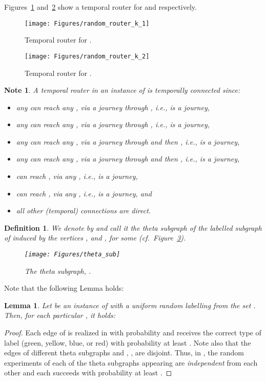 \documentclass[a4paper,UKenglish]{article}
\newtheorem{definition}{Definition}
\newtheorem{lemma}{Lemma}
\newtheorem*{note*}{Note}
\begin{document}
Figures~\ref{fig:random_router_k_1} and~\ref{fig:random_router_k_2} show a temporal router  for  and  respectively.
\begin{figure}[!htb]
\centering
\texttt{[image: Figures/random\_router\_k\_1]}
\caption{Temporal router  for .}
\label{fig:random_router_k_1}
\end{figure}

\begin{figure}[!htb]
\centering
\texttt{[image: Figures/random\_router\_k\_2]}
\caption{Temporal router  for .}
\label{fig:random_router_k_2}
\end{figure}

\begin{note*}
A temporal router  in an instance  of  is \emph{temporally connected} since:
\begin{itemize}
\item any  can reach any , via a journey through , i.e.,  is a journey,
\item any  can reach any , via a journey through , i.e.,  is a journey,
\item any  can reach any , via a journey through  and then , i.e.,  is a journey,
\item any  can reach any , via a journey through  and then , i.e.,  is a journey,
\item  can reach , via any , i.e.,  is a journey,
\item  can reach , via any , i.e.,  is a journey, and
\item all other (temporal) connections are direct.
\end{itemize}
\end{note*}

\begin{definition}
We denote by  and call it the \emph{ theta subgraph of } the labelled subgraph of  induced by the vertices , and , for some  (cf.~Figure~\ref{fig:theta_sub}).
\begin{figure}[!htb]
\centering
\texttt{[image: Figures/theta\_sub]}
\caption{The  theta subgraph, .}
\label{fig:theta_sub}
\end{figure}
\end{definition}

Note that the following Lemma holds:
\begin{lemma}\label{lem:rand_exp}
Let  be an instance of  with a uniform random labelling from the set . Then, for each particular , it holds:

\end{lemma}
\begin{proof}
Each edge of  is realized in  with probability  and receives the correct type of label (green, yellow, blue, or red) with probability at least . Note also that the edges of different theta subgraphs  and , , are disjoint. Thus, in , the random experiments of each of the theta subgraphs  appearing are \emph{independent} from each other and each succeeds with probability at least .
\end{proof}
\end{document}
